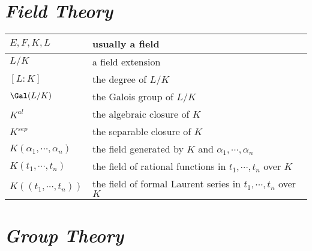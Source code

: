 
\section*{\emph{Field Theory}}

\begin{longtable}{ll}
    \hline
    $E,F,K,L$ & usually a field \\ \hline
    $L/K$ & a field extension \\ \hline
    $[L:K]$ & the degree of $L/K$ \\ \hline
    $\Gal(L/K)$ & the Galois group of $L/K$ \\ \hline
    $K^{al}$ & the algebraic closure of $K$ \\ \hline
    $K^{sep}$ & the separable closure of $K$ \\ \hline
    $K(\alpha_1,\cdots,\alpha_n)$ & the field generated by $K$ and $\alpha_1,\cdots,\alpha_n$ \\ \hline
    $K(t_1,\cdots,t_n)$ & the field of rational functions in $t_1,\cdots,t_n$ over $K$ \\ \hline
    $K(\!(t_1,\cdots,t_n)\!)$ & the field of formal Laurent series in $t_1,\cdots,t_n$ over $K$ \\ \hline
\end{longtable}


\section*{\emph{Group Theory}}

